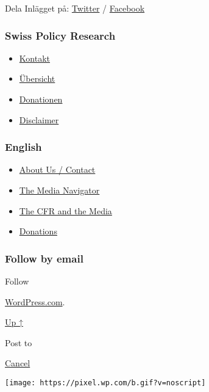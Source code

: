 Dela Inlägget på:
\href{https://twitter.com/intent/tweet?url=https://swprs.org/fakta-om-covid-19/}{Twitter}
/
\href{https://www.facebook.com/share.php?u=https://swprs.org/fakta-om-covid-19/}{Facebook}

\hypertarget{swiss-policy-research}{%
\subsubsection{Swiss Policy Research}\label{swiss-policy-research}}

\begin{itemize}
\tightlist
\item
  \href{https://swprs.org/kontakt/}{Kontakt}
\item
  \href{https://swprs.org/uebersicht/}{Übersicht}
\item
  \href{https://swprs.org/donationen/}{Donationen}
\item
  \href{https://swprs.org/disclaimer/}{Disclaimer}
\end{itemize}

\hypertarget{english}{%
\subsubsection{English}\label{english}}

\begin{itemize}
\tightlist
\item
  \href{https://swprs.org/contact/}{About Us / Contact}
\item
  \href{https://swprs.org/media-navigator/}{The Media Navigator}
\item
  \href{https://swprs.org/the-american-empire-and-its-media/}{The CFR
  and the Media}
\item
  \href{https://swprs.org/donations/}{Donations}
\end{itemize}

\hypertarget{follow-by-email}{%
\subsubsection{Follow by email}\label{follow-by-email}}

Follow

\href{https://wordpress.com/?ref=footer_custom_com}{WordPress.com}.

\protect\hyperlink{}{Up ↑}

Post to

\protect\hyperlink{}{Cancel}

\texttt{[image: https://pixel.wp.com/b.gif?v=noscript]}
